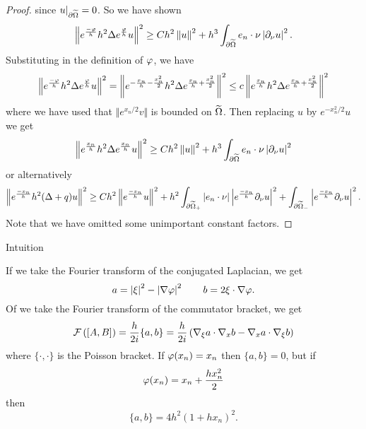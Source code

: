 \begin{proof}
  since $u|_{\partial\widetilde\Omega} = 0$.
  So we have shown
  \[ \left\lVert  e^\frac{-\varphi}{h} h^2 \Delta e^\frac{\varphi} h u  \right\rVert^2 \geq Ch^2\left\lVert u \right\rVert^2 + h^3 \int_{\partial\widetilde\Omega} e_n \cdot \nu \left\lvert \partial_\nu u \right\rvert^2. \]
  Substituting in the definition of $\varphi$, we have
  \[ \left\lVert  e^\frac{-\varphi}{h} h^2 \Delta e^\frac{\varphi} h u  \right\rVert^2 = \left\lVert  e^{-\frac{x_n}{h}-\frac{x_n^2}{2}} h^2 \Delta e^{\frac{x_n}{h}+\frac{x_n^2}{2}}  \right\rVert^2 \leq c \left\lVert  e^{\frac{x_n}{h}} h^2 \Delta e^{\frac{x_n}{h}+\frac{x_n^2}{2}}  \right\rVert^2 \]
  where we have used that $\Vert e^{x_n/2}v \Vert$ is bounded on $\widetilde\Omega$.
  Then replacing $u$ by $e^{-x_n^2/2}u$ we get
  \[ \left\lVert  e^\frac{x_n}{h} h^2 \Delta e^\frac{x_n}h u  \right\rVert^2 \geq Ch^2\left\lVert u \right\rVert^2 + h^3 \int_{\partial\widetilde\Omega} e_n \cdot \nu \left\lvert \partial_\nu u \right\rvert^2 \]
  or alternatively
  \[ \left\lVert  e^\frac{-x_n}{h} h^2 (\Delta+q)u  \right\rVert^2 \geq Ch^2 \left\lVert e^\frac{-x_n}{h} u  \right\rVert^2 + h^2 \int_{\partial\widetilde\Omega_+} \left\lvert e_n \cdot \nu \right\rvert \left\lvert  e^\frac{-x_n}{h} \partial_\nu u  \right\rvert^2 + \int_{\partial\widetilde\Omega_-} \left\lvert  e^\frac{-x_n}{h} \partial_\nu u  \right\rvert^2. \]
  Note that we have omitted some unimportant constant factors.
\end{proof}

Intuition

If we take the Fourier transform of the conjugated Laplacian, we get
\[ a = \left\lvert \xi \right\rvert^2 - \left\lvert \nabla\varphi \right\rvert^2 \qquad b = 2\xi \cdot \nabla\varphi. \]
Of we take the Fourier transform of the commutator bracket, we get
\[ \mathcal{F} \left( [A,B] \right) = \frac{h}{2i}\{a,b\} = \frac{h}{2i} \left( \nabla_\xi a \cdot \nabla_x b - \nabla_x a \cdot \nabla_\xi b \right) \]
where $\{\cdot,\cdot\}$ is the Poisson bracket.
If $\varphi(x_n)=x_n$ then $\{a,b\}=0$, but if
\[ \varphi(x_n)=x_n + \frac{hx_n^2}{2} \]
then
\[ \{a,b\} = 4h^2(1+hx_n)^2. \]
